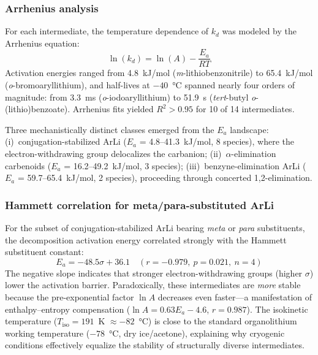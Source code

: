 \documentclass[journal=jcisd8,manuscript=article]{achemso}
\begin{document}
\subsubsection{Arrhenius analysis}

For each intermediate, the temperature dependence of $k_d$ was modeled by the Arrhenius equation:
\begin{equation}\label{eq:arrhenius}
\ln(k_d) = \ln(A) - \frac{E_a}{RT}
\end{equation}
Activation energies ranged from 4.8~kJ/mol (\textit{m}-lithiobenzonitrile) to 65.4~kJ/mol (\textit{o}-bromoaryllithium), and half-lives at $-40$~\si{\celsius} spanned nearly four orders of magnitude: from 3.3~ms (\textit{o}-iodoaryllithium) to 51.9~s (\textit{tert}-butyl \textit{o}-(lithio)benzoate).
Arrhenius fits yielded $R^2 > 0.95$ for 10 of 14 intermediates.

Three mechanistically distinct classes emerged from the $E_a$ landscape:
(i)~conjugation-stabilized ArLi ($E_a$ = 4.8--41.3~kJ/mol, 8 species), where the electron-withdrawing group delocalizes the carbanion;
(ii)~$\alpha$-elimination carbenoids ($E_a$ = 16.2--49.2~kJ/mol, 3 species);
(iii)~benzyne-elimination ArLi ($E_a$ = 59.7--65.4~kJ/mol, 2 species), proceeding through concerted 1,2-elimination.

\subsubsection{Hammett correlation for meta/para-substituted ArLi}

For the subset of conjugation-stabilized ArLi bearing \textit{meta} or \textit{para} substituents, the decomposition activation energy correlated strongly with the Hammett substituent constant:
\begin{equation}\label{eq:hammett}
E_a = -48.5\sigma + 36.1 \quad (r = -0.979,\ p = 0.021,\ n = 4)
\end{equation}
The negative slope indicates that stronger electron-withdrawing groups (higher $\sigma$) lower the activation barrier.
Paradoxically, these intermediates are \textit{more} stable because the pre-exponential factor $\ln A$ decreases even faster---a manifestation of enthalpy--entropy compensation ($\ln A = 0.63 E_a - 4.6$, $r = 0.987$).
The isokinetic temperature ($T_{\mathrm{iso}} = 191$~K $\approx -82$~\si{\celsius}) is close to the standard organolithium working temperature ($-78$~\si{\celsius}, dry ice/acetone), explaining why cryogenic conditions effectively equalize the stability of structurally diverse intermediates.
\end{document}
